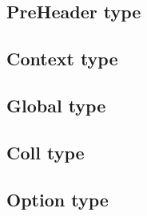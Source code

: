 \subsection{PreHeader type}
\label{sec:type:PreHeader}


\subsection{Context type}
\label{sec:type:Context}


\subsection{Global type}
\label{sec:type:Global}


\subsection{Coll type}
\label{sec:type:Coll}


\subsection{Option type}
\label{sec:type:Option}

